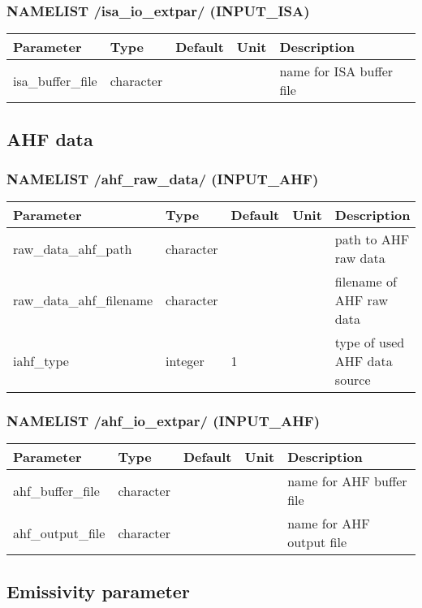 \documentclass[a4paper,10pt,DIV14,BCOR1cm,titlepage,twoside]{scrartcl}
\providecommand{\tabularnewline}{\\}
\begin{document}
\subsubsection*{NAMELIST /isa\_io\_extpar/ (INPUT\_ISA)}
\begin{longtable}{|p{4cm}|p{1.5cm}|p{1.5cm}|p{1cm}|p{6cm}|}
\hline 
\textbf{Parameter}& \textbf{Type}& \textbf{Default}& \textbf{Unit}& \textbf{Description}
\tabularnewline
\hline
\endhead
\hline
isa\_buffer\_file & character & &  & name for ISA buffer file
\tabularnewline
\hline 
\bottomrule
\end{longtable}

\subsection{AHF data}\label{namelist_input_for_extpar_ahf}

\subsubsection*{NAMELIST /ahf\_raw\_data/ (INPUT\_AHF)}

\begin{longtable}{|p{4cm}|p{1.5cm}|p{1.5cm}|p{1cm}|p{6cm}|}
\hline 
\textbf{Parameter}& \textbf{Type}& \textbf{Default}& \textbf{Unit}& \textbf{Description}
\tabularnewline
\hline
\endhead
\hline 
raw\_data\_ahf\_path & character & &  & path to AHF raw data \tabularnewline
\hline 
raw\_data\_ahf\_filename & character & &  & filename of AHF raw data \tabularnewline
\hline
iahf\_type & integer & 1 &  & type of used AHF data source \tabularnewline
\hline
\bottomrule
\end{longtable}

\subsubsection*{NAMELIST /ahf\_io\_extpar/ (INPUT\_AHF)}
\begin{longtable}{|p{4cm}|p{1.5cm}|p{1.5cm}|p{1cm}|p{6cm}|}
\hline 
\textbf{Parameter}& \textbf{Type}& \textbf{Default}& \textbf{Unit}& \textbf{Description}
\tabularnewline
\hline
\endhead
\hline
ahf\_buffer\_file & character & &  & name for AHF buffer file
\tabularnewline
ahf\_output\_file & character & &  & name for AHF output file
\tabularnewline
\hline 
\bottomrule
\end{longtable}


\subsection{Emissivity parameter}\label{namelist_input_for_extpar_emissivity}
\end{document}
